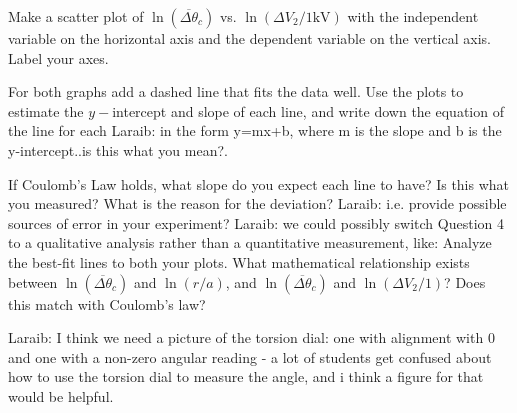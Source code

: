 \documentclass[addpoints]{physlabs}
\begin{document}
\begin{postlab}
\question[3] Make a scatter plot of $\ln{(\overline{\Delta\theta}_c)}$ vs. $\ln(\Delta V_2/1\text{kV})$ with the independent variable on the horizontal axis and the dependent variable on the vertical axis. Label your axes.
\begin{center}
    \end{center}

\newpage

\question[3] For both graphs add a dashed line that fits the data well.
        Use the plots to estimate the $y-$intercept and slope of each line, and write down the equation of the line for each {\color{red} Laraib: in the form y=mx+b, where m is the slope and b is the y-intercept..is this what you mean?}.
        \begin{solution}[150pt]
        \end{solution}

\question[3] If Coulomb's Law holds, what slope do you expect each line to have?
        Is this what you measured?
        What is the reason for the deviation? {\color{red} Laraib: i.e. provide possible sources of error in your experiment?}
        {\color{red} Laraib: we could possibly switch Question 4 to a qualitative analysis rather than a quantitative measurement, like: Analyze the best-fit lines to both your plots. What mathematical
        relationship exists between $\ln{(\overline{\Delta\theta}_c)}$ and $\ln{(r/a)}$, and $\ln{(\overline{\Delta\theta}_c)}$ and $\ln(\Delta V_2/1)$? Does this match with Coulomb's law?}
        \begin{solution}[150pt]
        \end{solution}

{\color{red} Laraib: I think we need a picture of the torsion dial: one with alignment with 0 and one with a non-zero angular reading - a lot of students get confused about how to use the torsion dial to measure the angle, and i think a figure for that would be helpful}.

\end{postlab}
\end{document}
